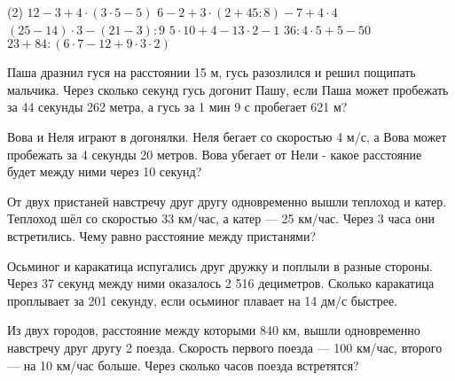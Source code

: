 \begin{class}[number=8]
	\begin{listofex}
		\item \begin{tasks}(2)
			\task \( 12-3+4\cdot(3\cdot5-5) \)
			\task \( 6-2+3\cdot(2+45:8)-7+4\cdot4 \)
			\task \( (25-14)\cdot3-(21-3):9 \)
			\task \( 5\cdot10+4-13\cdot2-1 \)
			\task \( 36:4\cdot5+5-50 \)
			\task \( 23+84:(6\cdot7-12+9\cdot3\cdot2) \)
		\end{tasks}
		\item Паша дразнил гуся на расстоянии 15 м, гусь разозлился и решил пощипать мальчика. Через сколько секунд гусь догонит Пашу, если Паша может пробежать за 44 секунды 262 метра, а гусь за 1 мин 9 с пробегает 621 м?
		\item Вова и Неля играют в догонялки. Неля бегает со скоростью 
		4 м/с, а Вова может пробежать за 4 секунды 20 метров. Вова убегает от Нели - какое расстояние будет между ними 
		через 10 секунд?
		\item От двух пристаней навстречу друг другу одновременно вышли теплоход и катер. Теплоход шёл со скоростью 33 км/час, а катер --- 25 км/час. Через 3 часа они встретились. Чему равно расстояние между пристанями?
		\item Осьминог и каракатица испугались друг дружку и поплыли в разные стороны. Через 37 секунд между ними оказалось 2 516 дециметров. Сколько каракатица проплывает за 201 секунду, если осьминог плавает на 14 дм/с быстрее.
		\item  Из двух городов, расстояние между которыми 840 км, вышли одновременно навстречу друг другу 2 поезда. Скорость первого поезда --- 100 км/час, второго --- на 10 км/час больше. Через сколько часов поезда встретятся?
	\end{listofex}
\end{class}

